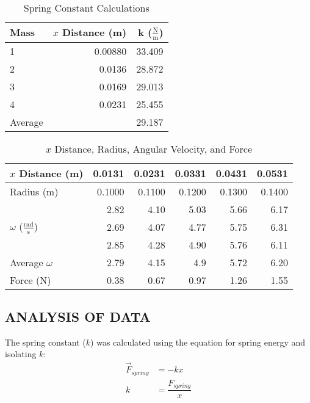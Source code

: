 \documentclass [12pt, letterpaper, twoside] {article}
\begin{document}
\begin {table}[h]
  \centering
    \begin {tabular} {| l | r | r |}
      \hline\hline
      Mass & \(x\) Distance (m) & k (\(\tfrac{\text{N}}{\text{m}}\)) \\
      \hline
      1 & 0.00880 & 33.409 \\ %
      \hline
      2 & 0.0136 & 28.872 \\ %
      \hline
      3 & 0.0169 & 29.013 \\ %
      \hline
      4 & 0.0231 & 25.455 \\ %
      \hline
      Average & & 29.187 \\ %
      \hline\hline
    \end {tabular}
  \caption {Spring Constant Calculations}
\end {table}

\begin {table}[h]
  \centering
  \begin {tabular} {| l | r | r | r | r | r |}
    \hline\hline
    \(x\) Distance (m) & 0.0131 & 0.0231 & 0.0331 & 0.0431 & 0.0531 \\
    \hline
    Radius (m) & 0.1000 & 0.1100 & 0.1200 & 0.1300 & 0.1400 \\
    \hline
    \multirow {3}{*}{\(\omega\) (\(\tfrac{\text{rad}}{\text{s}}\))} & 2.82 & 4.10 & 5.03 & 5.66 & 6.17 \\
    & 2.69 & 4.07 & 4.77 & 5.75 & 6.31 \\
    & 2.85 & 4.28 & 4.90 & 5.76 & 6.11 \\
    \hline
    Average \(\omega\) & 2.79 & 4.15 & 4.9 & 5.72 & 6.20 \\ %
    \hline
    Force (N) & 0.38 & 0.67 & 0.97 & 1.26 & 1.55 \\ %
    \hline\hline
  \end {tabular}
  \caption {\(x\) Distance, Radius, Angular Velocity, and Force}
\end {table}
    
\subsection* {ANALYSIS OF DATA}

The spring constant (\(k\)) was calculated using the equation for spring energy and isolating \(k\):
\begin {equation*}
  \begin {split}
    \vec{F}_{spring} & = -kx \\
    k & = \dfrac{F_{spring}}{x} \\
  \end {split}
\end {equation*}
\end{document}
